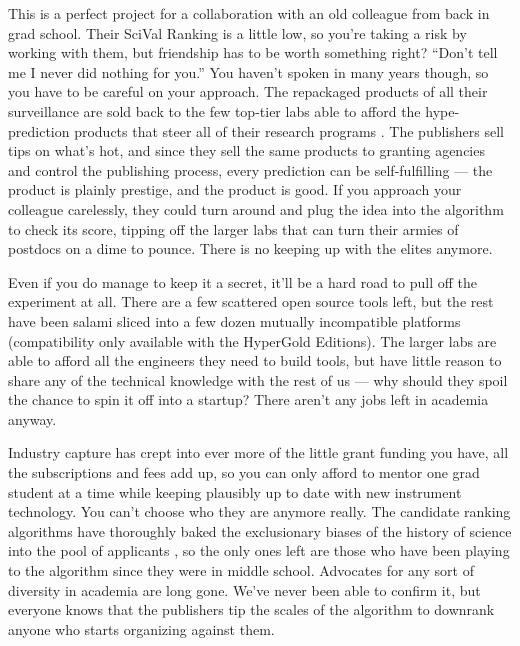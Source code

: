 This is a perfect project for a collaboration with an old colleague from
back in grad school. Their SciVal Ranking is a little low, so you're
taking a risk by working with them, but friendship has to be worth
something right? ``Don't tell me I never did nothing for you.'' You
haven't spoken in many years though, so you have to be careful on your
approach. The repackaged products of all their surveillance are sold
back to the few top-tier labs able to afford the hype-prediction
products that steer all of their research programs \citep{lifesciencesprofessionalservicesEmergingTrendsPancreatitis2021, elsevierTopicProminenceScience} . The publishers sell tips on what's
hot, and since they sell the same products to granting agencies and
control the publishing process, every prediction can be self-fulfilling
--- the product is plainly prestige, and the product is good. If you
approach your colleague carelessly, they could turn around and plug the
idea into the algorithm to check its score, tipping off the larger labs
that can turn their armies of postdocs on a dime to pounce. There is no
keeping up with the elites anymore.

Even if you do manage to keep it a secret, it'll be a hard road to pull
off the experiment at all. There are a few scattered open source tools
left, but the rest have been salami sliced into a few dozen mutually
incompatible platforms (compatibility only available with the HyperGold
Editions). The larger labs are able to afford all the engineers they
need to build tools, but have little reason to share any of the
technical knowledge with the rest of us --- why should they spoil the
chance to spin it off into a startup? There aren't any jobs left in
academia anyway.

Industry capture has crept into ever more of the little grant funding
you have, all the subscriptions and fees add up, so you can only afford
to mentor one grad student at a time while keeping plausibly up to date
with new instrument technology. You can't choose who they are anymore
really. The candidate ranking algorithms have thoroughly baked the
exclusionary biases of the history of science into the pool of
applicants\citep{pooleySurveillancePublishing2021, brembsAlgorithmicEmploymentDecisions2021} , so the only ones left are
those who have been playing to the algorithm since they were in middle
school. Advocates for any sort of diversity in academia are long gone.
We've never been able to confirm it, but everyone knows that the
publishers tip the scales of the algorithm to downrank anyone who starts
organizing against them.

